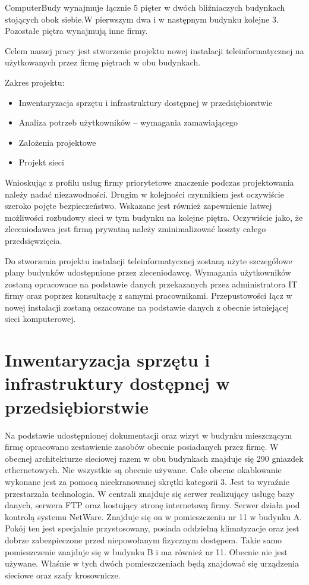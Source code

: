 \documentclass{report}
\begin{document}
ComputerBudy wynajmuje łącznie 5 pięter w dwóch bliźniaczych budynkach stojących obok siebie.W pierwszym dwa i w następnym budynku kolejne 3.
Pozostałe piętra wynajmują inne firmy.

Celem naszej pracy jest stworzenie projektu nowej instalacji teleinformatycznej na użytkowanych przez firmę piętrach w obu budynkach.
\pagebreak[4]

 Zakres projektu:
\begin{itemize}
\item{Inwentaryzacja sprzętu i infrastruktury dostępnej w przedsiębiorstwie}
\item{Analiza potrzeb użytkowników – wymagania zamawiającego}
\item{Założenia projektowe}
\item{Projekt sieci}
 
\end{itemize}
Wnioskując z profilu usług firmy priorytetowe znaczenie podczas projektowania należy nadać niezawodności. Drugim w kolejności czynnikiem jest oczywiście
szeroko pojęte bezpieczeństwo. Wskazane jest również zapewnienie łatwej możliwości rozbudowy sieci w tym budynku na kolejne piętra.
Oczywiście jako, że zleceniodawca jest firmą prywatną należy zminimalizować koszty całego przedsięwzięcia.

Do stworzenia projektu instalacji teleinformatycznej zostaną użyte szczegółowe plany budynków udostępnione przez zleceniodawcę.
Wymagania użytkowników zostaną opracowane na podstawie danych przekazanych przez administratora IT firmy oraz poprzez konsultację
z samymi pracownikami. Przepustowości łącz w nowej instalacji zostaną oszacowane na podstawie danych z obecnie istniejącej sieci komputerowej.

\chapter{Inwentaryzacja sprzętu i infrastruktury dostępnej w przedsiębiorstwie}
Na podstawie udostępnionej dokumentacji oraz wizyt w budynku mieszczącym firmę opracowano zestawienie zasobów obecnie posiadanych przez firmę.
W obecnej architekturze sieciowej razem w obu budynkach znajduje się 290 gniazdek ethernetowych. Nie wszystkie są obecnie używane.
Całe obecne okablowanie wykonane jest za pomocą nieekranowanej skrętki kategorii 3. Jest to wyraźnie przestarzała technologia. W centrali znajduje się serwer realizujący usługę
bazy danych, serwera FTP oraz hostujący stronę internetową firmy. Serwer działa pod kontrolą systemu NetWare. Znajduje się on w
pomieszczeniu nr 11 w budynku A. Pokój ten jest specjalnie przystosowany, posiada oddzielną klimatyzacje oraz jest 
dobrze zabezpieczone przed niepowołanym fizycznym dostępem. Takie samo pomieszczenie znajduje się w budynku B i ma również nr 11. Obecnie nie jest
używane. Właśnie w tych dwóch pomieszczeniach będą znajdować się urządzenia sieciowe oraz szafy krosownicze.
\end{document}
